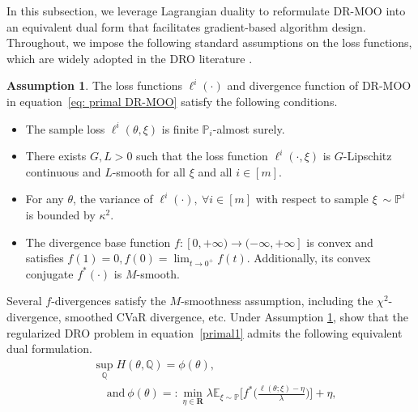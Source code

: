 \documentclass[twoside]{article} %
\def\eqref#1{equation~\ref{#1}}
\theoremstyle{plain}
\theoremstyle{definition}
\newtheorem{assumption}[theorem]{Assumption}
\theoremstyle{remark}
\begin{document}
In this subsection, we leverage Lagrangian duality to reformulate DR-MOO into an equivalent dual form that facilitates gradient-based algorithm design. Throughout, we impose the following standard assumptions on the loss functions, which are widely adopted in the DRO literature \citep{jinnonconvexdro,qirevistfDRO}.
\begin{assumption}\label{assumption 1}
The loss functions $\ell^i(\cdot)$ and divergence function of DR-MOO in \eqref{eq: primal DR-MOO} satisfy the following conditions.
\begin{itemize}[leftmargin = *, topsep = 0pt]
    \item The sample loss $\ell^i(\theta,\xi)$ is finite $\mathbb{P}_i$-almost surely.
    \item There exists $G,L>0$ such that the loss function $\ell^{i}(\cdot, \xi)$ is $G$-Lipschitz continuous and $L$-smooth for all $\xi$ and all $i\in[m]$.
        \item For any ${\theta}$, the variance of $\ell^i(\cdot),~\forall i\in[m]$ with respect to sample $\xi~\sim \mathbb{P}^i$ is bounded by $\kappa^2$. %
    \item The divergence base function $f:[0,+\infty)\rightarrow (-\infty,+\infty]$ is convex and satisfies $f(1)=0, f(0)=\lim_{t\rightarrow 0^{+}}f(t)$. Additionally, its convex conjugate $f^*(\cdot)$ is $M$-smooth.
\end{itemize}    
\end{assumption}
{Several $f$-divergences satisfy the $M$-smoothness assumption, including the $\chi^2$-divergence, smoothed CVaR divergence, etc.} Under Assumption \ref{assumption 1}, \citet{DROBook,DRO3rd,large-scaleDRO} show that the regularized DRO problem in \eqref{primal1} admits the following equivalent dual formulation.
\begin{align}
  &\sup_{\mathbb{Q}} H({\theta},\mathbb{Q}) =
  \phi(\theta),\nonumber\\
  &\quad ~\text{and}~ \phi(\theta)=
  :\min_{\eta\in \mathbf{R}} \lambda \mathbb{E}_{\xi\sim\mathbb{P}}\big[f^*\big(\frac{\ell({\theta};\xi)-\eta}{\lambda}\big)\big]+\eta,\label{eq: single-objective dual DRO}
\end{align}
\end{document}
